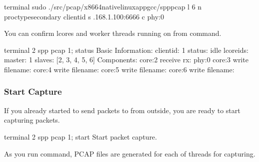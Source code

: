 \documentclass[a4paper,11pt,openany,oneside,english]{sphinxmanual}
\begin{document}
\begin{sphinxVerbatim}[commandchars=\\\{\},formatcom=\footnotesize]
 terminal 
 sudo ./src/pcap/x86\PYGZus{}64\PYGZhy{}native\PYGZhy{}linuxapp\PYGZhy{}gcc/spp\PYGZus{}pcap 
   \PYGZhy{}l \PYGZhy{}6 \PYGZhy{}n  \PYGZhy{}\PYGZhy{}proc\PYGZhy{}typesecondary 
   \PYGZhy{}\PYGZhy{} 
   \PYGZhy{}\PYGZhy{}client\PYGZhy{}id  \PYGZhy{}s .168.1.100:6666 
   \PYGZhy{}c phy:0
\end{sphinxVerbatim}

You can confirm lcores and worker threads running on from  command.

\begin{sphinxVerbatim}[commandchars=\\\{\},formatcom=\footnotesize]
\PYGZsh{} terminal 2
spp \PYGZgt{} pcap 1; status
Basic Information:
  \PYGZhy{} client\PYGZhy{}id: 1
  \PYGZhy{} status: idle
  \PYGZhy{} lcore\PYGZus{}ids:
    \PYGZhy{} master: 1
    \PYGZhy{} slaves: [2, 3, 4, 5, 6]
Components:
  \PYGZhy{} core:2 receive
    \PYGZhy{} rx: phy:0
  \PYGZhy{} core:3 write
    \PYGZhy{} filename:
  \PYGZhy{} core:4 write
    \PYGZhy{} filename:
  \PYGZhy{} core:5 write
    \PYGZhy{} filename:
  \PYGZhy{} core:6 write
    \PYGZhy{} filename:
\end{sphinxVerbatim}


\subsubsection{Start Capture}
\label{\detokenize{usecases/spp_pcap:start-capture}}\label{\detokenize{usecases/spp_pcap:spp-pcap-use-case-start-capture}}
If you already started to send packets to  from outside,
you are ready to start capturing packets.

\begin{sphinxVerbatim}[commandchars=\\\{\},formatcom=\footnotesize]
\PYGZsh{} terminal 2
spp \PYGZgt{} pcap 1; start
Start packet capture.
\end{sphinxVerbatim}

As you run  command, PCAP files are generated for each of
 threads for capturing.
\end{document}
